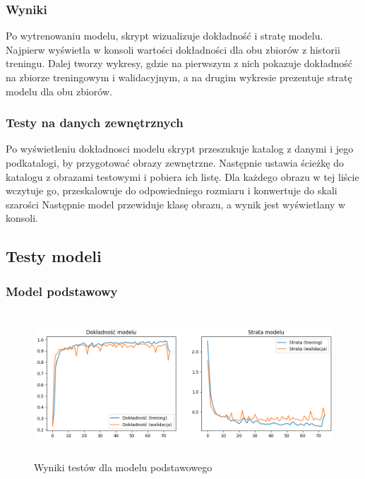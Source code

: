 \subsubsection{Wyniki}
Po wytrenowaniu modelu, skrypt wizualizuje dokładność i stratę modelu.
Najpierw wyświetla w konsoli wartości dokładności dla obu zbiorów z historii treningu.
Dalej tworzy wykresy, gdzie na pierwszym z nich pokazuje dokładność na zbiorze treningowym i walidacyjnym,
a na drugim wykresie prezentuje stratę modelu dla obu zbiorów.

\subsubsection{Testy na danych zewnętrznych}
Po wyświetleniu dokładnosci modelu skrypt przeszukuje katalog z danymi i jego podkatalogi, by przygotować obrazy zewnętrzne.
Następnie ustawia ścieżkę do katalogu z obrazami testowymi i pobiera ich listę.
Dla każdego obrazu w tej liście wczytuje go, przeskalowuje do odpowiedniego rozmiaru i konwertuje do skali szarości
Następnie model przewiduje klasę obrazu, a wynik jest wyświetlany w konsoli.

\subsection{Testy modeli}
\subsubsection{Model podstawowy}

\begin{figure}[ht]
	\centering
	\includegraphics[height=5.5cm]{partials/images/tests/v2_epoch75.png}
	\caption{Wyniki testów dla modelu podstawowego}
\label{Fig:GraphUndirected}
\end{figure}
\FloatBarrier

